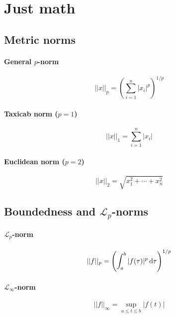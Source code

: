 \section{Just math}

\subsection{Metric norms}
\paragraph{General $p$-norm}
\begin{equation}
	||x||_p
	=
	\left(
		\sum_{i=1}^{n} |x_i|^p
	\right)
	^{1/p}
\end{equation}

\paragraph{Taxicab norm ($p=1$)}
\begin{equation}
	||x||_1
	=
	\sum_{i=1}^{n} |x_i|
\end{equation}

\paragraph{Euclidean norm ($p=2$)}
\begin{equation}
	||x||_2
	=
	\sqrt{x_1^2 + \cdots + x_n^2}
\end{equation}

\subsection[\texorpdfstring{Boundedness and $\mathcal{L}_p$-norms}
	{Boundedness and Lp-norms}]
	{Boundedness and $\mathcal{L}_p$-norms}
\paragraph{$\mathcal{L}_p$-norm}
\begin{equation}
	||f||_p
	=
	\left(
		\int_a^b |f(\tau)|^p \dif \tau
	\right)^{1/p}
\end{equation}

\paragraph{$\mathcal{L}_\infty$-norm}
\begin{equation}
	||f||_\infty
	=
	\sup_{a \leq t \leq b} |f(t)|
\end{equation}

